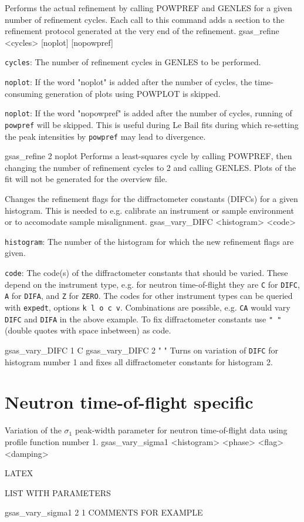 {
Performs the actual refinement by calling POWPREF and GENLES for a given number of refinement cycles. Each call to this command adds a section to the refinement protocol generated at the very end of the refinement.
}{
gsas\_refine <cycles> [noplot] [nopowpref]
}{
\item \texttt{cycles}: The number of refinement cycles in GENLES to be performed.
\item \texttt{noplot}: If the word "noplot" is added after the number of cycles, the time-consuming generation of plots using POWPLOT is skipped.
\item \texttt{noplot}: If the word "nopowpref" is added after the number of cycles, running of \texttt{powpref} will be skipped. This is useful during Le Bail fits during which re-setting the peak intensities by \texttt{powpref} may lead to divergence.
}{
gsas\_refine 2 noplot
}{
Performs a least-squares cycle by calling POWPREF, then changing the number of refinement cycles to 2 and calling GENLES. Plots of the fit will not be generated for the overview file.
}

{
Changes the refinement flags for the diffractometer constants (DIFCs) for a given histogram. This is needed to e.g. calibrate an instrument or sample environment or to accomodate sample misalignment.
}{
gsas\_vary\_DIFC <histogram> <code>
}{
\item \texttt{histogram}: The number of the histogram for which the new refinement flags are given.
\item \texttt{code}: The code(s) of the diffractometer constants that should be varied. These depend on the instrument type, e.g. for neutron time-of-flight they are \texttt{C} for \texttt{DIFC}, \texttt{A} for \texttt{DIFA}, and \texttt{Z} for \texttt{ZERO}. The codes for other instrument types can be queried with \texttt{expedt}, options \texttt{k l o c v}. Combinations are possible, e.g. \texttt{CA} would vary \texttt{DIFC} and \texttt{DIFA} in the above example. To fix diffractometer constants use \texttt{" "} (double quotes with space inbetween) as code.
}{
gsas\_vary\_DIFC 1 C
\newline
gsas\_vary\_DIFC 2 " "
}{
Turns on variation of \texttt{DIFC} for histogram number 1 and fixes all diffractometer constants for histogram 2.
}

\section{Neutron time-of-flight specific}

{
Variation of the $\sigma_1$ peak-width parameter for neutron time-of-flight data using profile function number 1.
}{
gsas\_vary\_sigma1 <histogram> <phase> <flag> <damping>
}{
\item LATEX \item LIST WITH PARAMETERS
}{
gsas\_vary\_sigma1 2 1
}{
COMMENTS FOR EXAMPLE
}
